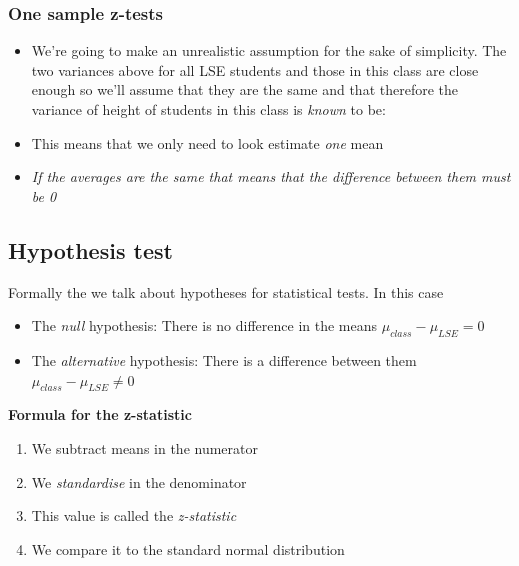 \documentclass[
]{gitbook}
\providecommand{\tightlist}{%
  \setlength{\itemsep}{0pt}\setlength{\parskip}{0pt}}
\begin{document}
\hypertarget{one-sample-z-tests}{%
\subsubsection{One sample z-tests}\label{one-sample-z-tests}}

\begin{itemize}
\tightlist
\item
  We're going to make an unrealistic assumption for the sake of simplicity. The two variances above for all LSE students and those in this class are close enough so we'll assume that they are the same and that therefore the variance of height of students in this class is \emph{known} to be:
\item
  This means that we only need to look estimate \emph{one} mean
\item
  \emph{If the averages are the same that means that the difference between them must be 0}
\end{itemize}

\hypertarget{hypothesis-test}{%
\subsection{Hypothesis test}\label{hypothesis-test}}

Formally the we talk about hypotheses for statistical tests. In this case

\begin{itemize}
\tightlist
\item
  The \emph{null} hypothesis: There is no difference in the means \(\mu_{class}-\mu_{LSE}=0\)
\item
  The \emph{alternative} hypothesis: There is a difference between them \(\mu_{class}-\mu_{LSE} \neq 0\)
\end{itemize}

\textbf{Formula for the z-statistic}


\begin{enumerate}
\def\labelenumi{\arabic{enumi}.}
\tightlist
\item
  We subtract means in the numerator
\item
  We \emph{standardise} in the denominator
\item
  This value is called the \emph{z-statistic}
\item
  We compare it to the standard normal distribution
\end{enumerate}
\end{document}
